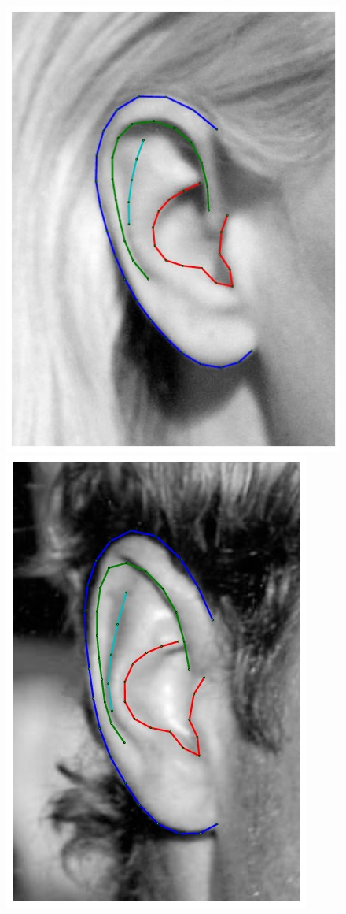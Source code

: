 \begin{figure}[!t]
    \includegraphics[height=\flowhh]{resources/Ear_Deformable_Model/fittings/final_0010}
    \includegraphics[height=\flowhh]{resources/Ear_Deformable_Model/fittings/final_0027}

\end{figure}
